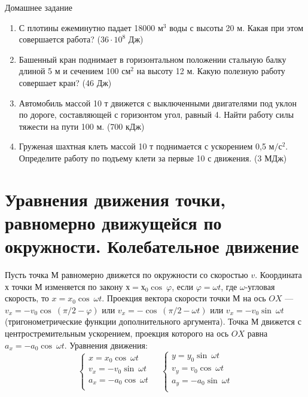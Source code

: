 \documentclass[a5paper, 10pt]{diss_4}
\renewcommand{\'}{\,'}
\begin{document}
\begin{center}
   Домашнее задание
\end{center}
\begin{enumerate}

\item С плотины ежеминутно падает 18000 $м^3$ воды с высоты 20 м. Какая при этом совершается работа?
($36\cdot10^8$ Дж)

\item Башенный кран поднимает в горизонтальном положении стальную балку длиной 5 м и сечением 100 $см^2$ на высоту 12 м. Какую полезную работу совершает кран? (46 Дж)

\item Автомобиль массой 10 т движется с выключенными двигателями под уклон по дороге, составляющей с горизонтом угол, равный 4\textdegree. Найти работу силы тяжести на пути 100 м. (700 кДж)

\item Груженая шахтная клеть массой 10 т поднимается с ускорением 0,5 $м/с^2$. Определите работу по подъему клети за первые 10 с движения. (3 МДж)

\end{enumerate}


\section{Уравнения движения точки, равномерно движущейся по окружности. Колебательное движение}

Пусть точка $М$ равномерно движется по окружности со скоростью $v$. Координата $х$ точки $М$ изменяется по закону
$х=х_0\cos\ \varphi$, если $\varphi=\omega t$, где $\omega$-угловая скорость, то $x = x_0\cos\ \omega t$. Проекция вектора скорости точки $М$ на ось $OX$ --- $v_x=-v_0\cos\ (\pi/2-\varphi)$ или $v_x=-\cos\ (\pi/2-\omega t)$ или
$v_x=-v_0\sin\ \omega t$ (тригонометрические функции дополнительного аргумента). Точка $М$ движется с центростремительным ускорением, проекция которого на ось $OX$ равна  $a_x=-a_0\cos\ \omega t$.  Уравнения движения:
\begin{equation*}
     \left\{
          \begin{array}{lr}
x=x_0\cos\ \omega t\\
v_x=-v_0\sin\ \omega t\\
a_x=-a_0\cos\ \omega t\\
          \end{array}
     \right.\ \ \ \ \
     \left\{
          \begin{array}{lr}
y=y_0\sin\ \omega t\\
v_y=v_0\cos\ \omega t\\
a_y=-a_0\sin\ \omega t\\
          \end{array}
     \right.
\end{equation*}
\end{document}
